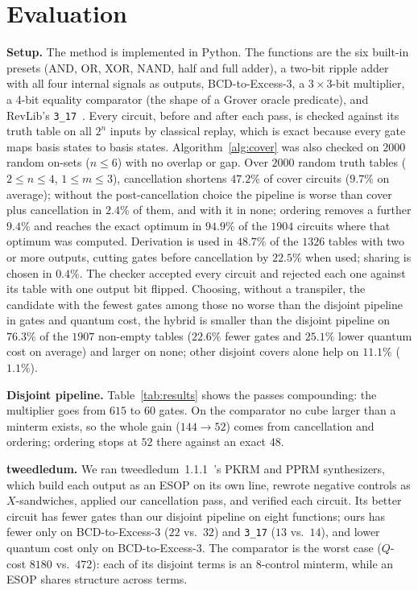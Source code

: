 \documentclass[conference]{IEEEtran}
\theoremstyle{plain}
\begin{document}
\section{Evaluation}
\textbf{Setup.} The method is implemented in Python. The functions are
the six built-in presets (AND, OR, XOR, NAND, half and full adder), a
two-bit ripple adder with all four internal signals as outputs,
BCD-to-Excess-3, a $3\times3$-bit multiplier, a 4-bit equality
comparator (the shape of a Grover oracle predicate), and RevLib's
\texttt{3\_17}~\cite{revlib2008}. Every circuit, before and after each
pass, is checked against its truth table on all $2^n$ inputs by classical
replay, which is exact because every gate maps basis states to basis
states. Algorithm~\ref{alg:cover} was also checked on $2000$ random
on-sets ($n\le6$) with no overlap or gap. Over $2000$ random truth tables
($2\le n\le4$, $1\le m\le3$), cancellation shortens $47.2\%$ of cover
circuits ($9.7\%$ on average); without the post-cancellation choice the
pipeline is worse than cover plus cancellation in $2.4\%$ of them, and
with it in none; ordering removes a further $9.4\%$ and reaches the
exact optimum in $94.9\%$ of the $1904$ circuits where that optimum was
computed. Derivation is used in $48.7\%$ of the $1326$ tables with two
or more outputs, cutting gates before cancellation by $22.5\%$ when
used; sharing is chosen in $0.4\%$. The checker accepted every circuit
and rejected each one against its table with one output bit flipped.
Choosing, without a transpiler, the candidate with the fewest gates
among those no worse than the disjoint pipeline in gates and quantum
cost, the hybrid is smaller than the disjoint pipeline on
$76.3\%$ of the $1907$ non-empty tables ($22.6\%$ fewer gates and
$25.1\%$ lower quantum cost on average) and larger on none; other
disjoint covers alone help on $11.1\%$ ($1.1\%$).

\textbf{Disjoint pipeline.} Table~\ref{tab:results} shows the passes
compounding: the multiplier goes from $615$ to $60$ gates. On the comparator no cube
larger than a minterm exists, so the whole gain ($144\to52$) comes from
cancellation and ordering; ordering stops at $52$ there against an exact
$48$.

\textbf{tweedledum.} We ran tweedledum~1.1.1~\cite{schmitt2022}'s PKRM
and PPRM synthesizers, which build each output as an ESOP on its own
line, rewrote negative controls as $X$-sandwiches, applied our
cancellation pass, and verified each circuit. Its better circuit has
fewer gates than our disjoint pipeline on eight functions; ours has
fewer only on BCD-to-Excess-3 ($22$ vs.\ $32$) and \texttt{3\_17} ($13$
vs.\ $14$), and lower quantum cost only on BCD-to-Excess-3. The
comparator is the worst case ($Q$-cost $8180$ vs.\ $472$): each of its
disjoint terms is an 8-control minterm, while an ESOP shares structure
across terms.
\end{document}
